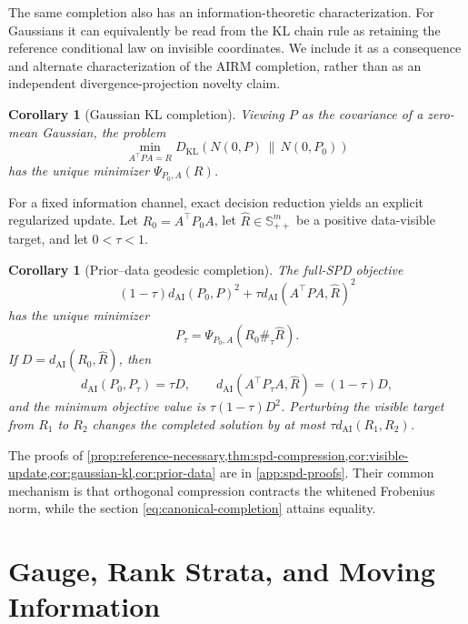 \documentclass[10pt]{article}
\theoremstyle{plain}
\newtheorem{corollary}[theorem]{Corollary}
\theoremstyle{definition}
\theoremstyle{remark}
\newcommand{\SPD}{\mathbb S_{++}}
\newcommand{\AI}{\mathrm{AI}}
\newcommand{\dai}{d_{\AI}}
\newcommand{\Rhat}{\widehat R}
\begin{document}
The same completion also has an information-theoretic characterization.
For Gaussians it can equivalently be read from the KL chain rule as retaining
the reference conditional law on invisible coordinates.  We include it as a
consequence and alternate characterization of the AIRM completion, rather
than as an independent divergence-projection novelty claim.

\begin{corollary}[Gaussian KL completion]
\label{cor:gaussian-kl}
Viewing \(P\) as the covariance of a zero-mean Gaussian, the problem
\begin{equation}
  \min_{A^\top PA=R}
  D_{\mathrm{KL}}\!\left(N(0,P)\,\|\,N(0,P_0)\right)
  \label{eq:gaussian-kl-problem}
\end{equation}
has the unique minimizer \(\Psi_{P_0,A}(R)\).
\end{corollary}

For a fixed information channel, exact decision reduction yields an explicit
regularized update.  Let \(R_0=A^\top P_0A\), let \(\Rhat\in\SPD^m\) be a
positive data-visible target, and let \(0<\tau<1\).

\begin{corollary}[Prior--data geodesic completion]
\label{cor:prior-data}
The full-SPD objective
\begin{equation}
  (1-\tau)\dai(P_0,P)^2
  +\tau\dai(A^\top PA,\Rhat)^2
  \label{eq:prior-data-objective}
\end{equation}
has the unique minimizer
\begin{equation}
  \boxed{
  P_\tau=\Psi_{P_0,A}(R_0\#_\tau\Rhat).}
  \label{eq:prior-data-solution}
\end{equation}
If \(D=\dai(R_0,\Rhat)\), then
\[
  \dai(P_0,P_\tau)=\tau D,
  \qquad
  \dai(A^\top P_\tau A,\Rhat)=(1-\tau)D,
\]
and the minimum objective value is \(\tau(1-\tau)D^2\).  Perturbing the
visible target from \(R_1\) to \(R_2\) changes the completed solution by at
most \(\tau\dai(R_1,R_2)\).
\end{corollary}

The proofs of
\cref{prop:reference-necessary,thm:spd-compression,cor:visible-update,cor:gaussian-kl,cor:prior-data}
are in
\cref{app:spd-proofs}.  Their common mechanism is that orthogonal compression
contracts the whitened Frobenius norm, while the section
\eqref{eq:canonical-completion} attains equality.

\section{Gauge, Rank Strata, and Moving Information}
\label{sec:stratified-geometry}
\end{document}
